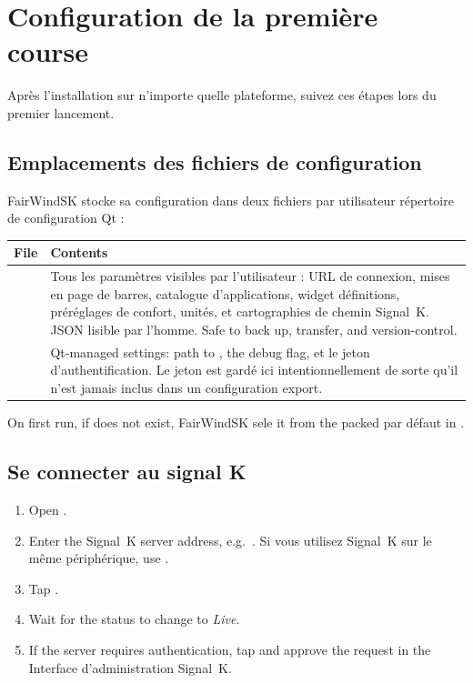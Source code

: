 \section{Configuration de la première course}
\label{app:firstrun}

Après l'installation sur n'importe quelle plateforme, suivez ces étapes lors du premier lancement.

\subsection{Emplacements des fichiers de configuration}

FairWindSK stocke sa configuration dans deux fichiers par utilisateur
répertoire de configuration Qt :

\begin{longtable}{L{3.6cm}L{10.1cm}}
\toprule
{}
\color{white}\sffamily\bfseries File &
\color{white}\sffamily\bfseries Contents \\
\midrule
{}  &
Tous les paramètres visibles par l'utilisateur : URL de connexion, mises en page de barres, catalogue d'applications,
widget définitions, préréglages de confort, unités, et cartographies de chemin Signal~K.
JSON lisible par l'homme.
  Safe to back up, transfer, and version-control. \\
   &
  Qt-managed settings: path to , the debug flag,
et le jeton d'authentification.
Le jeton est gardé ici intentionnellement de sorte qu'il n'est jamais inclus dans un
  configuration export. \\
\bottomrule
\end{longtable}

On first run, if  does not exist, FairWindSK
sele it from the packed par défaut in
.

\subsection{Se connecter au signal K}

\begin{enumerate}
  \item Open .
  \item Enter the Signal~K server address,
        e.g.\ .
Si vous utilisez Signal~K sur le même périphérique,
        use .
  \item Tap .
  \item Wait for the status to change to \textit{Live}.
  \item If the server requires authentication,
        tap  and approve the request in the
Interface d'administration Signal~K.
\end{enumerate}

